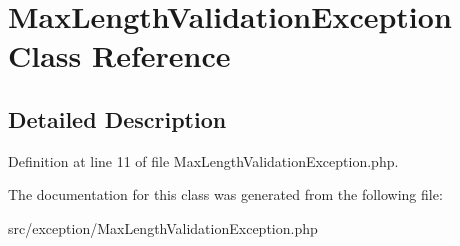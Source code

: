 \hypertarget{classcommon_1_1user_1_1exception_1_1_max_length_validation_exception}{\section{\-Max\-Length\-Validation\-Exception \-Class \-Reference}
\label{classcommon_1_1user_1_1exception_1_1_max_length_validation_exception}
}


\subsection{\-Detailed \-Description}


\-Definition at line 11 of file \-Max\-Length\-Validation\-Exception.\-php.



\-The documentation for this class was generated from the following file\-:\begin{DoxyCompactItemize}
\item 
src/exception/\-Max\-Length\-Validation\-Exception.\-php\end{DoxyCompactItemize}
